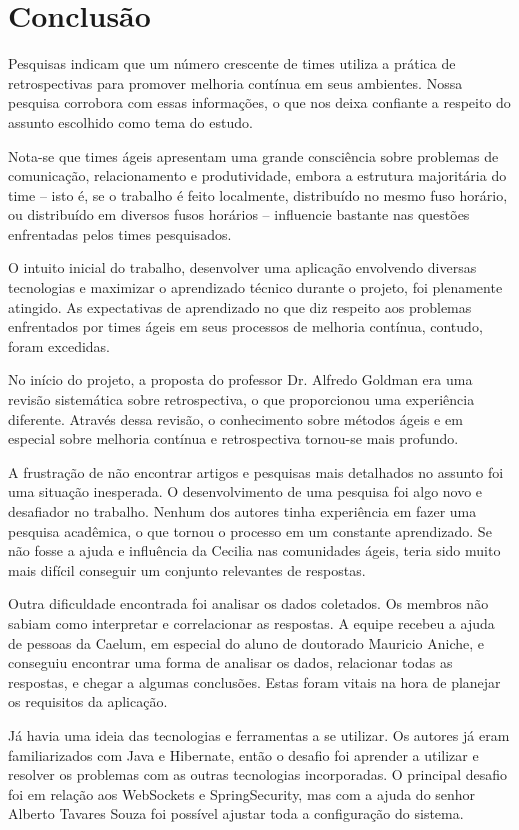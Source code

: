 \section{Conclusão}

Pesquisas indicam que um número crescente de times utiliza a prática de retrospectivas para promover melhoria contínua em seus ambientes. Nossa pesquisa corrobora com essas informações, o que nos deixa confiante a respeito do assunto escolhido como tema do estudo.

Nota-se que times ágeis apresentam uma grande consciência sobre problemas de comunicação, relacionamento e produtividade, embora a estrutura majoritária do time -- isto é, se o trabalho é feito localmente, distribuído no mesmo fuso horário, ou distribuído em diversos fusos horários -- influencie bastante nas questões enfrentadas pelos times pesquisados.

O intuito inicial do trabalho, desenvolver uma aplicação envolvendo diversas tecnologias e maximizar o aprendizado técnico durante o projeto, foi plenamente atingido. As expectativas de aprendizado no que diz respeito aos problemas enfrentados por times ágeis em seus processos de melhoria contínua, contudo, foram excedidas.

No início do projeto, a proposta do professor Dr. Alfredo Goldman era uma revisão sistemática sobre retrospectiva, o que proporcionou uma experiência diferente. Através dessa revisão, o conhecimento sobre métodos ágeis e em especial sobre melhoria contínua e retrospectiva tornou-se mais profundo.

A frustração de não encontrar artigos e pesquisas mais detalhados no assunto foi uma situação inesperada. O desenvolvimento de uma pesquisa foi algo novo e desafiador no trabalho. Nenhum dos autores tinha experiência em fazer uma pesquisa acadêmica, o que tornou o processo em um constante aprendizado. Se não fosse a ajuda e influência da Cecilia nas comunidades ágeis, teria sido muito mais difícil conseguir um conjunto relevantes de respostas.

Outra dificuldade encontrada foi analisar os dados coletados. Os membros não sabiam como interpretar e correlacionar as respostas. A equipe recebeu a ajuda de pessoas da Caelum, em especial do aluno de doutorado Mauricio Aniche, e conseguiu encontrar uma forma de analisar os dados, relacionar todas as respostas, e chegar a algumas conclusões. Estas foram vitais na hora de planejar os requisitos da aplicação.

Já havia uma ideia das tecnologias e ferramentas a se utilizar. Os autores já eram familiarizados com Java e Hibernate, então o desafio foi aprender a utilizar e resolver os problemas com as outras tecnologias incorporadas. O principal desafio foi em relação aos WebSockets e SpringSecurity, mas com a ajuda do senhor Alberto Tavares Souza foi possível ajustar toda a configuração do sistema.

